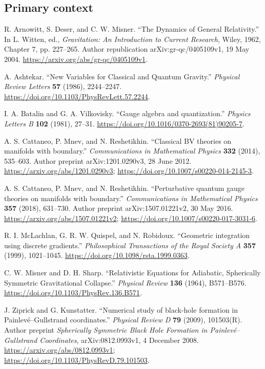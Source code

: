 \subsection*{Primary context}
\begin{enumerate}[label={[C\arabic*]},leftmargin=2.5em]
\item R. Arnowitt, S. Deser, and C. W. Misner. ``The Dynamics of General Relativity.'' In L. Witten, ed., \emph{Gravitation: An Introduction to Current Research}, Wiley, 1962, Chapter 7, pp. 227--265. Author republication arXiv:gr-qc/0405109v1, 19 May 2004. \url{https://arxiv.org/abs/gr-qc/0405109v1}.
\item A. Ashtekar. ``New Variables for Classical and Quantum Gravity.'' \emph{Physical Review Letters} \textbf{57} (1986), 2244--2247. \url{https://doi.org/10.1103/PhysRevLett.57.2244}.
\item I. A. Batalin and G. A. Vilkovisky. ``Gauge algebra and quantization.'' \emph{Physics Letters B} \textbf{102} (1981), 27--31. \url{https://doi.org/10.1016/0370-2693(81)90205-7}.
\item A. S. Cattaneo, P. Mnev, and N. Reshetikhin. ``Classical BV theories on manifolds with boundary.'' \emph{Communications in Mathematical Physics} \textbf{332} (2014), 535--603. Author preprint arXiv:1201.0290v3, 28 June 2012. \url{https://arxiv.org/abs/1201.0290v3}; \url{https://doi.org/10.1007/s00220-014-2145-3}.
\item A. S. Cattaneo, P. Mnev, and N. Reshetikhin. ``Perturbative quantum gauge theories on manifolds with boundary.'' \emph{Communications in Mathematical Physics} \textbf{357} (2018), 631--730. Author preprint arXiv:1507.01221v2, 30 May 2016. \url{https://arxiv.org/abs/1507.01221v2}; \url{https://doi.org/10.1007/s00220-017-3031-6}.
\item R. I. McLachlan, G. R. W. Quispel, and N. Robidoux. ``Geometric integration using discrete gradients.'' \emph{Philosophical Transactions of the Royal Society A} \textbf{357} (1999), 1021--1045. \url{https://doi.org/10.1098/rsta.1999.0363}.
\item C. W. Misner and D. H. Sharp. ``Relativistic Equations for Adiabatic, Spherically Symmetric Gravitational Collapse.'' \emph{Physical Review} \textbf{136} (1964), B571--B576. \url{https://doi.org/10.1103/PhysRev.136.B571}.
\item J. Ziprick and G. Kunstatter. ``Numerical study of black-hole formation in Painlev\'e--Gullstrand coordinates.'' \emph{Physical Review D} \textbf{79} (2009), 101503(R). Author preprint \emph{Spherically Symmetric Black Hole Formation in Painlev\'e--Gullstrand Coordinates}, arXiv:0812.0993v1, 4 December 2008. \url{https://arxiv.org/abs/0812.0993v1}; \url{https://doi.org/10.1103/PhysRevD.79.101503}.
\end{enumerate}

